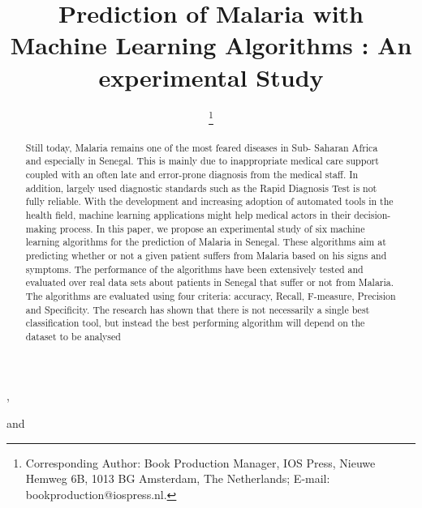 \documentclass{IOS-Book-Article}
\def\hb{\hbox to 10.7 cm{}}
\begin{document}
\pagestyle{headings}
\def\thepage{}

\begin{frontmatter}              %


\title{Prediction of Malaria with Machine Learning
Algorithms : An experimental Study}

\markboth{}{November 2020\hb}

\author[A]{ %
\thanks{Corresponding Author: Book Production Manager, IOS Press, Nieuwe Hemweg 6B,
1013 BG Amsterdam, The Netherlands; E-mail:
bookproduction@iospress.nl.}},
\author[B]{ }
and
\author[B]{ }

\address[A]{ALioune Diop University of Bambey }
\address[B]{ALioune Diop University of Bambey}

\begin{abstract}
Still today, Malaria remains one of the most feared diseases in Sub- Saharan Africa and especially in Senegal. This is mainly due to inappropriate medical care support coupled with an often late and error-prone diagnosis from the medical staff. In addition, largely used diagnostic standards such as the Rapid Diagnosis Test is not fully reliable. With the development and increasing adoption of automated tools in the health field, machine learning applications might help medical actors in their decision-making process. In this paper, we propose an experimental study of six machine learning algorithms for the prediction of Malaria in Senegal. These algorithms aim at predicting whether or not a given patient suffers from Malaria based on his signs and symptoms. The performance of the algorithms have been extensively tested and evaluated over real data sets about patients in Senegal that suffer or not from Malaria. The algorithms are evaluated using four criteria: accuracy, Recall, F-measure, Precision and Specificity. The research has shown that there is not necessarily a single best classification tool, but instead the best performing algorithm will depend on the dataset to be analysed
\end{abstract}

\begin{keyword}

\end{keyword}
\end{frontmatter}










\begin{thebibliography}{99}


\end{thebibliography}
\end{document}
